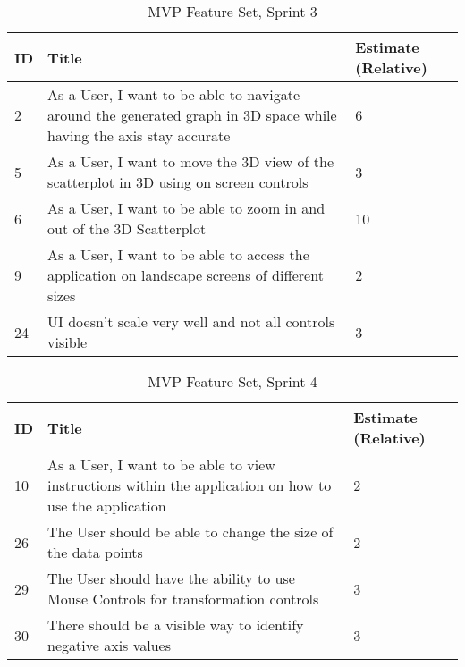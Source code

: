 \begin{table*}[h]
    \begin{tabularx}{\textwidth}{ | X | X | X | }
        \hline
        ID & Title                                                                                                               & Estimate (Relative) \\
        \hline
        2  & As a User, I want to be able to navigate around the generated graph in 3D space while having the axis stay accurate & 6                   \\
        \hline
        5  & As a User, I want to move the 3D view of the scatterplot in 3D using on screen controls                             & 3                   \\
        \hline
        6  & As a User, I want to be able to zoom in and out of the 3D Scatterplot                                               & 10                  \\
        \hline
        9  & As a User, I want to be able to access the application on landscape screens of different sizes                      & 2                   \\
        \hline
        24 & UI doesn't scale very well and not all controls visible                                                             & 3                   \\
        \hline
    \end{tabularx}
    \caption{MVP Feature Set, Sprint 3}
    \label{sprint3}
\end{table*}

\begin{table*}[h]
    \begin{tabularx}{\textwidth}{ | X | X | X | }
        \hline
        ID & Title                                                                                                  & Estimate (Relative) \\
        \hline
        10 & As a User, I want to be able to view instructions within the application on how to use the application & 2                   \\
        \hline
        26 & The User should be able to change the size of the data points                                          & 2                   \\
        \hline
        29 & The User should have the ability to use Mouse Controls for transformation controls                     & 3                   \\
        \hline
        30 & There should be a visible way to identify negative axis values                                         & 3                   \\
        \hline
    \end{tabularx}
    \caption{MVP Feature Set, Sprint 4}
    \label{sprint4}
\end{table*}

